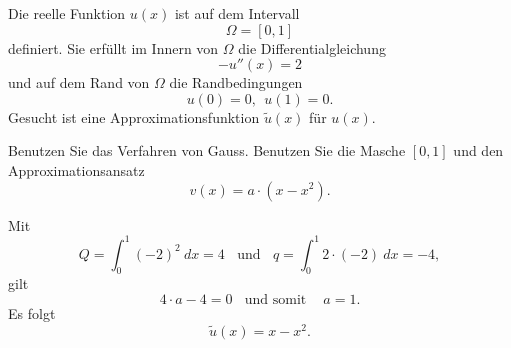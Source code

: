 Die reelle Funktion $u(x)$ ist auf dem Intervall
\[
\Omega = [0, 1]
\]
definiert. Sie erfüllt im Innern von $\Omega$ die Differentialgleichung
\[
- u''(x) = 2
\]
und auf dem Rand von $\Omega$ die Randbedingungen
\[
u(0) = 0, \ \ u(1) = 0.
\]
Gesucht ist eine Approximationsfunktion $\tilde u(x)$ für $u(x)$.

Benutzen Sie das Verfahren von Gauss. Benutzen Sie die Masche $[0,1]$
und den Approximationsansatz
\[
v(x) = a \cdot (x - x^2).
\]


\begin{loesung}
Mit
\[
Q = \int_0^1 (-2)^2 \ dx = 4 \ \ \ \ \mbox{und}  \ \ \ \ q = \int_0^1 2 \cdot (-2) \  dx = -4,
\]
gilt
\[
4 \cdot a - 4 = 0  \ \ \ \ \mbox{und somit }  \ \ \ \ a = 1.
\]
Es folgt
\[
\tilde u(x) = x - x^2.
\]
\end{loesung}
